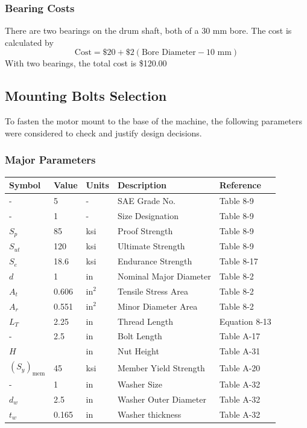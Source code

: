 \documentclass[letterpaper,12pt]{article}
\begin{document}
\subsubsection{Bearing Costs}

There are two bearings on the drum shaft, both of a 30 mm bore. The cost is calculated by
\begin{equation}
    \text{Cost} = \$20 + \$2(\text{Bore Diameter} - 10 \text{ mm})
\end{equation}
With two bearings, the total cost is \$120.00

\subsection{Mounting Bolts Selection}
To fasten the motor mount to the base of the machine, the following parameters were considered to check and justify design decisions.
\subsubsection{Major Parameters}
\begin{center}
	\begin{tabular}{|p{1.5cm}|p{1.5cm}|p{1.5cm}|p{5cm}|p{2.5cm}|}
		\hline
		Symbol & Value & Units & Description & Reference \\
		\hline
		- & 5 & - & SAE Grade No. & Table 8-9\\
		- & 1 & - & Size Designation & Table 8-9\\
		$S_{p}$ & 85 & ksi & Proof Strength & Table 8-9\\
		$S_{ut}$ & 120 & ksi & Ultimate Strength & Table 8-9 \\
		$S_{e}$ & 18.6 & ksi & Endurance Strength & Table 8-17 \\	
		$d$ & 1 & in & Nominal Major Diameter & Table 8-2 \\
		$A_{t}$ & 0.606 & $\text{in}^{2}$ & Tensile Stress Area & Table 8-2 \\
		$A_{r}$ & 0.551 & $\text{in}^{2}$ & Minor Diameter Area & Table 8-2 \\
		$L_{T}$ & 2.25 & in & Thread Length & Equation 8-13 \\
		- & 2.5 & in & Bolt Length & Table A-17\\
		$H$ & \sfrac{55}{64} & in & Nut Height & Table A-31 \\
		$(S_y)_\text{mem}$ & 45 & ksi & Member Yield Strength & Table A-20\\
		- & 1 & in & Washer Size & Table A-32\\
		$d_w$ & 2.5 & in & Washer Outer Diameter & Table A-32\\
		$t_w$ & 0.165 & in & Washer thickness & Table A-32\\
		\hline
	\end{tabular}
\end{center}
\end{document}
